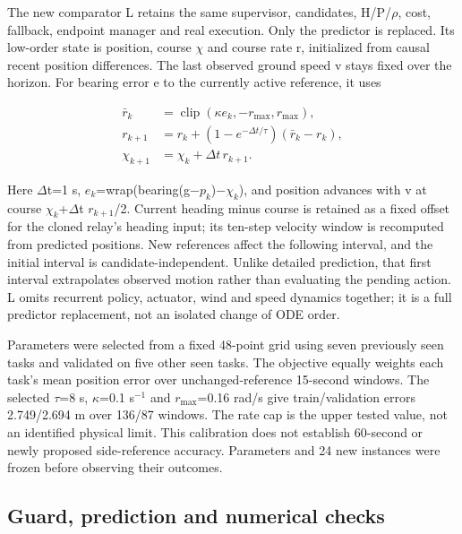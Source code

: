 \documentclass[conference]{IEEEtran}
\begin{document}
The new comparator L retains the same supervisor, candidates, H/P/\ensuremath{\rho}, cost, fallback, endpoint manager and real execution. Only the predictor is replaced. Its low-order state is position, course \ensuremath{\chi} and course rate r, initialized from causal recent position differences. The last observed ground speed v stays fixed over the horizon. For bearing error e to the currently active reference, it uses

\begin{equation}\label{eq:5}
\begin{aligned}\bar r_k&=\operatorname{clip}(\kappa e_k,-r_{\max},r_{\max}),\\r_{k+1}&=r_k+(1-e^{-\Delta t/\tau})(\bar r_k-r_k),\\\chi_{k+1}&=\chi_k+\Delta t\,r_{k+1}.\end{aligned}
\end{equation}

Here \ensuremath{\Delta}t=1 s, $e_k$=wrap(bearing(g\ensuremath{-}$p_k$)\ensuremath{-}$\chi_k$), and position advances with v at course $\chi_k$+\ensuremath{\Delta}t $r_{k+1}$/2. Current heading minus course is retained as a fixed offset for the cloned relay's heading input; its ten-step velocity window is recomputed from predicted positions. New references affect the following interval, and the initial interval is candidate-independent. Unlike detailed prediction, that first interval extrapolates observed motion rather than evaluating the pending action. L omits recurrent policy, actuator, wind and speed dynamics together; it is a full predictor replacement, not an isolated change of ODE order.

Parameters were selected from a fixed 48-point grid using seven previously seen tasks and validated on five other seen tasks. The objective equally weights each task's mean position error over unchanged-reference 15-second windows. The selected \ensuremath{\tau}=8 s, \ensuremath{\kappa}=0.1 s$^{-1}$ and $r_{\max}$=0.16 rad/s give train/validation errors 2.749/2.694 m over 136/87 windows. The rate cap is the upper tested value, not an identified physical limit. This calibration does not establish 60-second or newly proposed side-reference accuracy. Parameters and 24 new instances were frozen before observing their outcomes.

\subsection{Guard, prediction and numerical checks}
\end{document}

